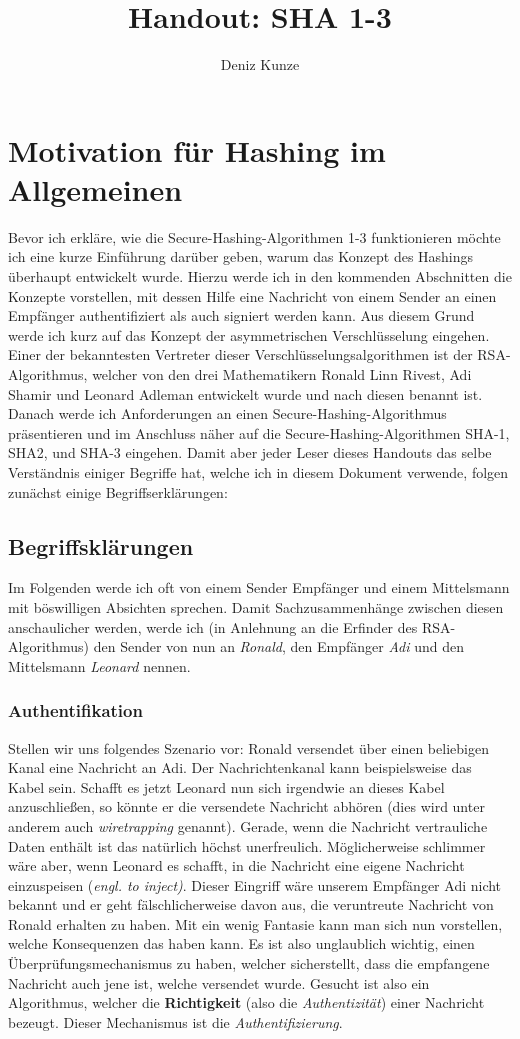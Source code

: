 \documentclass{article}
\title{Handout: SHA 1-3}
\author{Deniz Kunze}
\begin{document}
	\maketitle
	\newpage
	\tableofcontents
	\newpage

	\section{Motivation für Hashing im Allgemeinen}
	Bevor ich erkläre, wie die Secure-Hashing-Algorithmen 1-3 funktionieren möchte ich eine kurze Einführung darüber geben, warum  das Konzept des Hashings überhaupt entwickelt wurde. Hierzu werde ich in den kommenden Abschnitten die Konzepte vorstellen, mit dessen Hilfe eine Nachricht von einem Sender an einen Empfänger authentifiziert als auch signiert werden kann. Aus diesem Grund werde ich kurz auf das Konzept der asymmetrischen Verschlüsselung eingehen. Einer der bekanntesten Vertreter dieser Verschlüsselungsalgorithmen ist der RSA-Algorithmus, welcher von den drei Mathematikern Ronald Linn Rivest, Adi Shamir und Leonard Adleman entwickelt wurde und nach diesen benannt ist. Danach werde ich Anforderungen an einen Secure-Hashing-Algorithmus präsentieren und im Anschluss näher auf die Secure-Hashing-Algorithmen SHA-1, SHA2, und SHA-3 eingehen.
	Damit aber jeder Leser dieses Handouts das selbe Verständnis einiger Begriffe hat, welche ich in diesem Dokument verwende, folgen zunächst einige Begriffserklärungen:
	\subsection{Begriffsklärungen}
	Im Folgenden werde ich oft von einem Sender Empfänger und einem Mittelsmann mit böswilligen Absichten sprechen. Damit Sachzusammenhänge zwischen diesen anschaulicher werden, werde ich (in Anlehnung an die Erfinder des RSA-Algorithmus) den Sender von nun an \textit{Ronald}, den Empfänger \textit{Adi} und den Mittelsmann \textit{Leonard} nennen.
	\subsubsection{Authentifikation}
	Stellen wir uns folgendes Szenario vor:
	Ronald versendet über einen beliebigen Kanal eine Nachricht an Adi. Der Nachrichtenkanal kann beispielsweise das Kabel sein. Schafft es jetzt Leonard nun sich irgendwie an dieses Kabel anzuschließen, so könnte er die versendete Nachricht abhören (dies wird unter anderem auch \textit{wiretrapping} genannt). Gerade, wenn die Nachricht vertrauliche Daten enthält ist das natürlich höchst unerfreulich. Möglicherweise schlimmer wäre aber, wenn Leonard es schafft, in die Nachricht eine eigene Nachricht einzuspeisen (\textit{engl. to inject)}. Dieser Eingriff wäre unserem Empfänger Adi nicht bekannt und er geht fälschlicherweise davon aus, die veruntreute Nachricht von Ronald erhalten zu haben. Mit ein wenig Fantasie kann man sich nun vorstellen, welche Konsequenzen das haben kann. Es ist also unglaublich wichtig, einen Überprüfungsmechanismus zu haben, welcher sicherstellt, dass die empfangene Nachricht auch jene ist, welche versendet wurde. Gesucht ist also ein Algorithmus, welcher die \textbf{Richtigkeit} (also die \textit{Authentizität}) einer Nachricht bezeugt. Dieser Mechanismus ist die \textit{Authentifizierung}.
\end{document}
